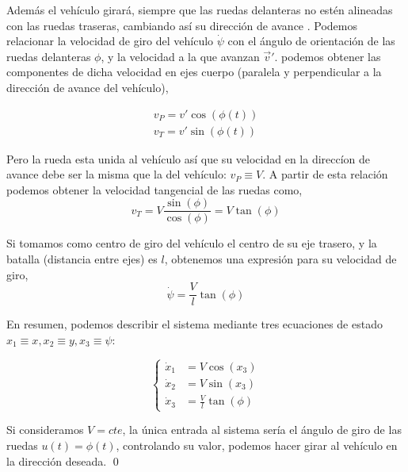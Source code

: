 \begin{example}
Además el vehículo girará, siempre que las ruedas delanteras no estén alineadas con las ruedas traseras, cambiando así su dirección de avance . Podemos relacionar la velocidad de giro del vehículo $\dot{\psi}$ con el ángulo de orientación de las ruedas delanteras $\phi$, y la velocidad a la que avanzan $\vec{v}'$.  podemos obtener las componentes de dicha velocidad en ejes cuerpo (paralela y perpendicular a la dirección de avance del vehículo),

\begin{align}
v_{P} = v'\cos(\phi(t))\\
v_{T} = v'\sin(\phi(t))
\end{align} 

Pero la rueda esta unida al vehículo así que su velocidad en la direccíon de avance debe ser la misma que la del vehículo: $v_P \equiv V$.  A partir de esta relación podemos obtener la velocidad tangencial de las ruedas como,
\begin{equation}
v_T = V\frac{\sin(\phi)}{\cos(\phi)} = V\tan(\phi)
\end{equation}

Si tomamos como centro de giro del vehículo el centro de su eje trasero, y la batalla (distancia entre ejes) es $l$, obtenemos una expresión para su velocidad de giro,
\begin{equation}
\dot{\psi} = \frac{V}{l}\tan(\phi)
\end{equation}

En resumen, podemos describir el sistema mediante tres ecuaciones de estado $x_1 \equiv x, x_2\equiv	y, x_3 \equiv \psi$:


\begin{equation}
	\begin{cases}
		\dot x_1 &=  V\cos(x_3)\\  
		\dot x_2 &=  V\sin(x_3)\\
		\dot x_3 &= \frac{V}{l}\tan(\phi)
	\end{cases}
\end{equation}

Si consideramos $V=cte$, la única entrada al sistema sería el ángulo de giro de las ruedas $u(t) = \phi(t)$, controlando su valor, podemos hacer girar al vehículo en la dirección deseada. \qed
\end{example}

